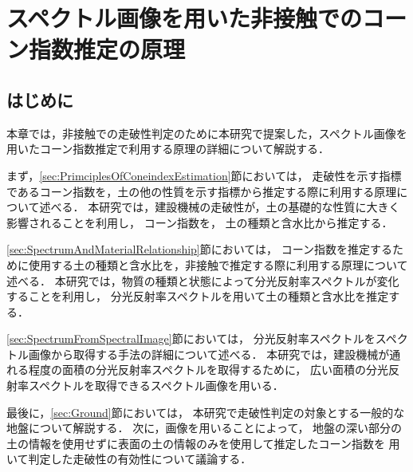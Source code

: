 \chapter{スペクトル画像を用いた非接触でのコーン指数推定の原理}
\thispagestyle{empty}
\label{ch:PrinciplesOfMethod}
\minitoc

\newpage

\section{はじめに}

本章では，非接触での走破性判定のために本研究で提案した，スペクトル画像を用いたコーン指数推定で利用する原理の詳細について解説する．

まず，\ref{sec:PrimciplesOfConeindexEstimation}節においては，
走破性を示す指標であるコーン指数を，土の他の性質を示す指標から推定する際に利用する原理について述べる．
本研究では，建設機械の走破性が，土の基礎的な性質に大きく影響されることを利用し，
コーン指数を，
土の種類と含水比から推定する．

\ref{sec:SpectrumAndMaterialRelationship}節においては，
コーン指数を推定するために使用する土の種類と含水比を，非接触で推定する際に利用する原理について述べる．
本研究では，物質の種類と状態によって分光反射率スペクトルが変化することを利用し，
分光反射率スペクトルを用いて土の種類と含水比を推定する．

\ref{sec:SpectrumFromSpectralImage}節においては，
分光反射率スペクトルをスペクトル画像から取得する手法の詳細について述べる．
本研究では，建設機械が通れる程度の面積の分光反射率スペクトルを取得するために，
広い面積の分光反射率スペクトルを取得できるスペクトル画像を用いる．

最後に，\ref{sec:Ground}節においては，
本研究で走破性判定の対象とする一般的な地盤について解説する．
次に，画像を用いることによって，
地盤の深い部分の土の情報を使用せずに表面の土の情報のみを使用して推定したコーン指数を
用いて判定した走破性の有効性について議論する．

\newpage



